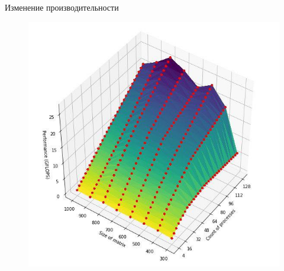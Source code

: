 \documentclass{beamer}
\begin{document}
\begin{frame}{Изменение производительности}

\begin{figure}[ht]
\centering 
    \includegraphics[scale=0.4]{../image/p.jpg}
\end{figure}

\end{frame}
\end{document}
